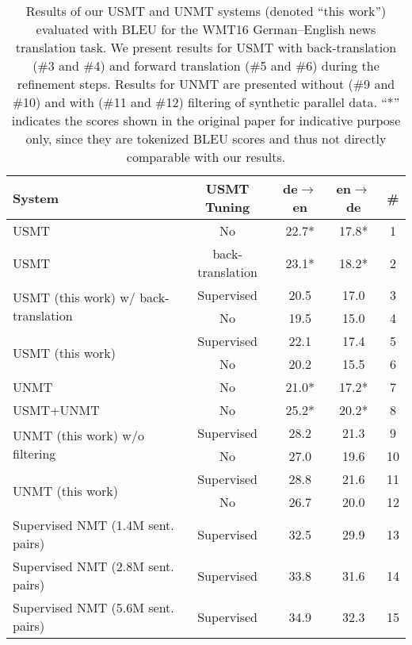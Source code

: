 \documentclass[11pt,a4paper]{article}
\begin{document}
\begin{table*}[t]
\centering
\begin{tabular}{lcccc}
\toprule
 System & USMT Tuning & de$\rightarrow$en & en$\rightarrow$de & \# \\ 
\midrule
 \citet{DBLP:journals/corr/abs-1804-07755} USMT & No  & 22.7* & 17.8* & 1\\
 \citet{artetxe2018unsupervised}  USMT    & back-translation & 23.1* & 18.2* & 2 \\
\midrule
\multirow{2}{*}{USMT (this work) w/ back-translation}  & Supervised  & 20.5  & 17.0 & 3\\
 & No   & 19.5  & 15.0  & 4\\ 
 \midrule
\multirow{2}{*}{USMT (this work)}& Supervised  &  22.1 & 17.4 & 5 \\
 & No  & 20.2  &15.5 & 6 \\
 \midrule
\citet{DBLP:journals/corr/abs-1804-07755} UNMT & No & 21.0* & 17.2* & 7\\
\midrule
\citet{DBLP:journals/corr/abs-1804-07755} USMT+UNMT & No  & 25.2* & 20.2* & 8\\
\midrule 
  \multirow{2}{*}{UNMT (this work) w/o filtering } & Supervised   & 28.2  & 21.3 & 9 \\
 & No & 27.0 &19.6  & 10 \\
 \midrule
\multirow{2}{*}{UNMT (this work)} & Supervised  & 28.8  & 21.6 & 11 \\
 & No  & 26.7  & 20.0 & 12\\
\midrule
\midrule
Supervised NMT (1.4M sent. pairs) & Supervised  & 32.5  & 29.9 & 13 \\
Supervised NMT (2.8M sent. pairs) & Supervised  & 33.8  & 31.6 & 14 \\
Supervised NMT (5.6M sent. pairs) & Supervised  & 34.9  & 32.3 & 15 \\
\bottomrule
\end{tabular}
\caption{\label{tab:results} Results of our USMT and UNMT systems (denoted ``this work'') evaluated with BLEU for the WMT16 German--English news translation task.  We present results for USMT with back-translation (\#3 and \#4) and forward translation (\#5 and \#6) during the refinement steps. Results for UNMT are presented without (\#9 and \#10) and with (\#11 and \#12) filtering of synthetic parallel data. ``*'' indicates the scores shown in the original paper for indicative purpose only, since they are tokenized BLEU scores and thus not directly comparable with our results.}
\end{table*}
\end{document}
